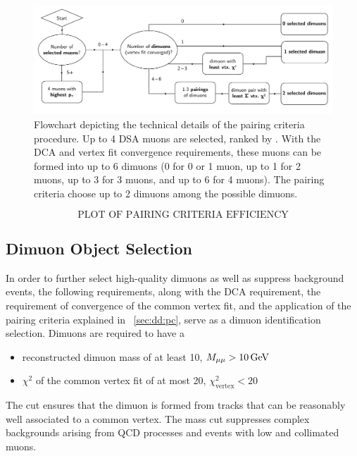 \begin{figure}[htpb]
  \centering
  \includegraphics[width=\textwidth]{figures/displaced/PairingCriteriaAlgorithm.pdf}
  \caption{Flowchart depicting the technical details of the pairing criteria procedure. Up to 4 DSA muons are selected, ranked by \pT. With the DCA and vertex fit convergence requirements, these muons can be formed into up to 6 dimuons (0 for 0 or 1 muon, up to 1 for 2 muons, up to 3 for 3 muons, and up to 6 for 4 muons). The pairing criteria choose up to 2 dimuons among the possible dimuons.}
  \label{fig:dd:pca}
\end{figure}


$$\text{PLOT OF PAIRING CRITERIA EFFICIENCY}$$

\subsection{Dimuon Object Selection}
In order to further select high-quality dimuons as well as suppress background events, the following requirements, along with the DCA requirement, the requirement of convergence of the common vertex fit, and the application of the pairing criteria explained in \Sec~\ref{sec:dd:pc}, serve as a dimuon identification selection.
Dimuons are required to have a
\begin{itemize}
  \item reconstructed dimuon mass of at least 10\GeV, \ie $M_{\mu\mu} > 10\,\text{Ge\hspace{-.08em}V}$
  \item $\chi^2$ of the common vertex fit of at most 20, \ie $\chi^2_\text{vertex} < 20$
\end{itemize}

The \vchisq cut ensures that the dimuon is formed from tracks that can be reasonably well associated to a common vertex.
The mass cut suppresses complex backgrounds arising from QCD processes and events with low \pT and collimated muons.

